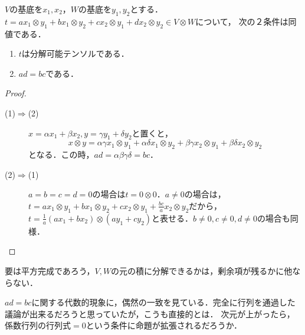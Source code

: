 \documentclass[uplatex, dvipdfmx]{jsreport}
\begin{document}
\begin{proposition}[分解不可能テンソルの存在]
    $V$の基底を$x_1,x_2$，$W$の基底を$y_1,y_2$とする．
    $t=ax_1\otimes y_1+bx_1\otimes y_2+cx_2\otimes y_1+dx_2\otimes y_2\in V\otimes W$について，
    次の２条件は同値である．
    \begin{enumerate}
        \item $t$は分解可能テンソルである．
        \item $ad=bc$である．
    \end{enumerate}
\end{proposition}
\begin{proof}\mbox{}
    \begin{description}
        \item[(1)$\Rightarrow$(2)] $x=\alpha x_1+\beta x_2,y=\gamma y_1+\delta y_2$と置くと，
        \[x\otimes y=\alpha\gamma x_1\otimes y_1+\alpha\delta x_1\otimes y_2+\beta\gamma x_2\otimes y_1+\beta\delta x_2\otimes y_2\]
        となる．この時，$ad=\alpha\beta\gamma\delta=bc$．
        \item[(2)$\Rightarrow$(1)] $a=b=c=d=0$の場合は$t=0\otimes 0$．$a\ne 0$の場合は，
        $t=ax_1\otimes y_1+bx_1\otimes y_2+cx_2\otimes y_1+\frac{bc}{a}x_2\otimes y_2$だから，$t=\frac{1}{a}(ax_1+bx_2)\otimes(ay_1+cy_2)$と表せる．$b\ne 0,c\ne 0,d\ne 0$の場合も同様．
    \end{description}
\end{proof}
\begin{remarks}
    要は平方完成であろう，$V,W$の元の積に分解できるかは，剰余項が残るかに他ならない．

    $ad=bc$に関する代数的現象に，偶然の一致を見ている．完全に行列を通過した議論が出来るだろうと思っていたが，こうも直接的とは．
    次元が上がったら，係数行列の行列式$=0$という条件に命題が拡張されるだろうか．
\end{remarks}
\end{document}
